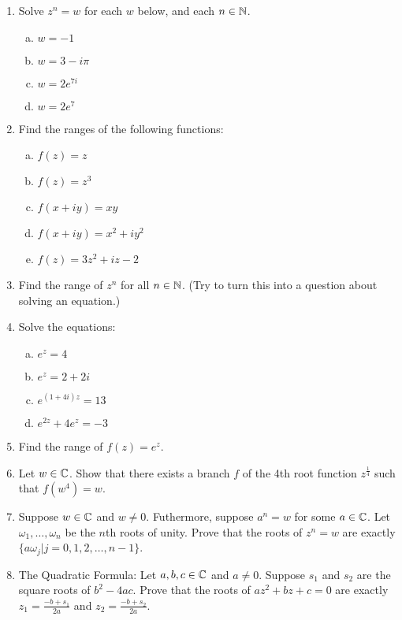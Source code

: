 \begin{enumerate}
\item Solve $z^n = w$ for each $w$ below, and each $n \in \mathbb{N}$.

\begin{enumerate}[a)]
\item $w = -1$
\item $w = 3 - i\pi$
\item $w = 2e^{7i}$
\item $w = 2e^{7}$
\end{enumerate}

\item Find the ranges of the following functions:

\begin{enumerate}[a)]
\item $f(z) = z$
\item $f(z) = z^3$
\item $f(x + iy) = xy$
\item $f(x + iy) =x^2 + i y^2$
\item $f(z) = 3z^2 + iz - 2$
\end{enumerate}

\item Find the range of $z^n$ for all $n \in \mathbb{N}$. (Try to turn this into a question about solving an equation.)

\item Solve the equations:

\begin{enumerate}[a)]
\item $e^z = 4$
\item $e^z = 2+2i$
\item $e^{(1+4i)z} = 13$
\item $e^{2z} + 4e^z = -3$
\end{enumerate}

\item Find the range of $f(z) = e^z$.

\item Let $w \in \mathbb{C}$. Show that there exists a branch $f$ of the 4th root function $z^\frac{1}{4}$ such that $f(w^4) = w$.

\item Suppose $w \in \mathbb{C}$ and $w \ne 0$. Futhermore, suppose $a^n = w$ for some $a \in \mathbb{C}$. Let $\omega_1,\dots, \omega_n$ be the $n$th roots of unity. Prove that the roots of $z^n = w$ are exactly $\{a\omega_j| j = 0, 1,2,\dots,n-1\}$.


\item The Quadratic Formula: Let $a,b,c \in \mathbb{C}$ and $a\ne 0$. Suppose $s_1$ and $s_2$ are the square roots of $b^2 - 4ac$. Prove that the roots of $az^2 + bz + c = 0$ are exactly $z_1 = \frac{-b + s_1}{2a}$ and $z_2 = \frac{-b + s_2}{2a}$.


\end{enumerate}
